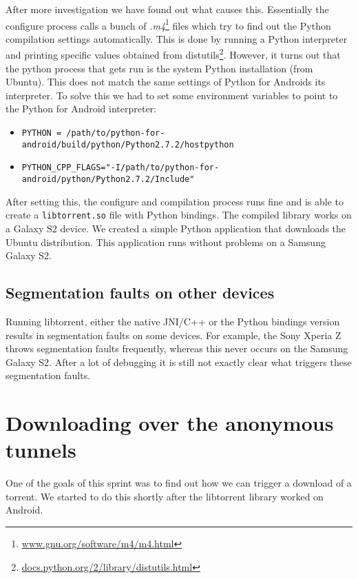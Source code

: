 			After more investigation we have found out what causes this. Essentially the configure process calls a bunch of \emph{.m4}\footnote{\href{https://www.gnu.org/software/m4/m4.html}{www.gnu.org/software/m4/m4.html}} files which try to find out the Python compilation settings automatically. This is done by running a Python interpreter and printing specific values obtained from distutils\footnote{\href{https://docs.python.org/2/library/distutils.html}{docs.python.org/2/library/distutils.html}}. However, it turns out that the python process that gets run is the system Python installation (from Ubuntu). This does not match the same settings of Python for Androids its interpreter. To solve this we had to set some environment variables to point to the Python for Android interpreter:
			
			\begin{itemize}
				\item \texttt{PYTHON = /path/to/python-for-android/build/python/Python2.7.2/hostpython}
				\item \texttt{PYTHON\_CPP\_FLAGS="-I/path/to/python-for-android/python/Python2.7.2/Include"}
			\end{itemize}
			
			After setting this, the configure and compilation process runs fine and is able to create a \texttt{libtorrent.so} file with Python bindings. The compiled library works on a Galaxy S2 device. We created a simple Python application that downloads the Ubuntu distribution. This application runs without problems on a Samsung Galaxy S2.
			
		\subsection{Segmentation faults on other devices}
			Running libtorrent, either the native JNI/C++ or the Python bindings version results in segmentation faults on some devices. For example, the Sony Xperia Z throws segmentation faults frequently, whereas this never occurs on the Samsung Galaxy S2.  After a lot of debugging it is still not exactly clear what triggers these segmentation faults.
		
	\section{Downloading over the anonymous tunnels}
	One of the goals of this sprint was to find out how we can trigger a download of a torrent. We started to do this shortly after the libtorrent library worked on Android.
	
